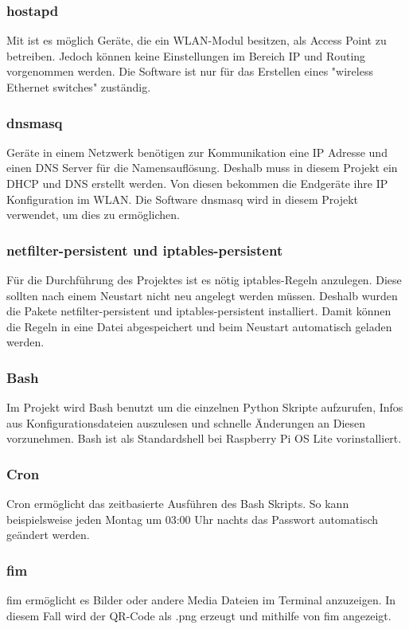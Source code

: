 \documentclass[a4paper,11pt,singlespacing]{article}
\begin{document}
    		\subsubsection{hostapd}
        		Mit  ist es möglich Geräte, die ein WLAN-Modul besitzen, als Access Point zu betreiben. Jedoch können keine Einstellungen im Bereich IP und Routing vorgenommen werden. Die Software ist nur für das Erstellen eines "wireless Ethernet switches" zuständig. \cite{Quote_hostapd1} 
    		\subsubsection{dnsmasq}
        		Geräte in einem Netzwerk benötigen zur Kommunikation eine IP Adresse und einen DNS Server für die Namensauflösung. Deshalb muss in diesem Projekt ein DHCP und DNS erstellt werden. Von diesen bekommen die Endgeräte ihre IP Konfiguration im WLAN. Die Software dnsmasq wird in diesem Projekt verwendet, um dies zu ermöglichen.
    		\subsubsection{netfilter-persistent und iptables-persistent}
        		Für die Durchführung des Projektes ist es nötig iptables-Regeln anzulegen. Diese sollten nach einem Neustart nicht neu angelegt werden müssen. Deshalb wurden die Pakete netfilter-persistent und iptables-persistent installiert. Damit können die Regeln in eine Datei abgespeichert und beim Neustart automatisch geladen werden.
        	\subsubsection{Bash}
        		Im Projekt wird Bash benutzt um die einzelnen Python Skripte aufzurufen, Infos aus Konfigurationsdateien auszulesen und schnelle Änderungen an Diesen vorzunehmen. Bash ist als Standardshell bei Raspberry Pi OS Lite vorinstalliert. 
    		\subsubsection{Cron}
				Cron ermöglicht das zeitbasierte Ausführen des Bash Skripts. So kann beispielsweise jeden Montag um 03:00 Uhr nachts das Passwort automatisch geändert werden.
			\subsubsection{fim}
				fim ermöglicht es Bilder oder andere Media Dateien im Terminal anzuzeigen. In diesem Fall wird der QR-Code als .png erzeugt und mithilfe von fim angezeigt.
\end{document}
